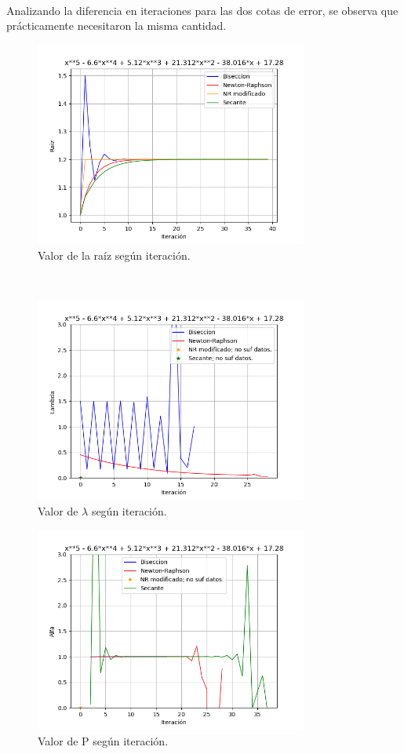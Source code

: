 \documentclass[titlepage,a4paper]{article}
\begin{document}
\\Analizando la diferencia en iteraciones para las dos cotas de error, se observa que prácticamente necesitaron la misma cantidad.
\begin{figure}[H]
\centering
\includegraphics[width=0.8\textwidth]{raiz f2.png}
\caption{\label{fig:class01}Valor de la raíz según iteración.}
\end{figure}
\\
\begin{figure}[H]
\centering
\includegraphics[width=0.8\textwidth]{lambda f2.png}
\caption{\label{fig:class01}Valor de $\lambda$ según iteración.}
\end{figure}
\begin{figure}[H]
\centering
\includegraphics[width=0.8\textwidth]{alfa f2.png}
\caption{\label{fig:class01}Valor de P según iteración.}
\end{figure}
\end{document}
